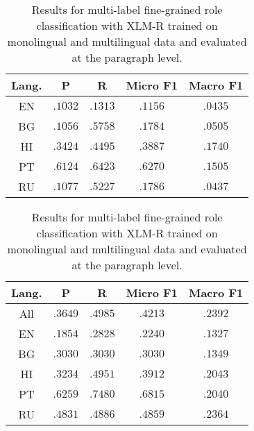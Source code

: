 \begin{table}[h]
\footnotesize
\centering

\begin{subtable}[h]{0.9\columnwidth}
\small
\centering
\caption{Monolingual setting}
\begin{tabular}{ccccc}
\toprule
Lang. & P & R & Micro F1 & Macro F1 \\
\midrule
EN & $.1032$ & $.1313$ & $.1156$ & $.0435$ \\
BG & $.1056$ & $.5758$ & $.1784$ & $.0505$ \\
HI & $.3424$ & $.4495$ & $.3887$ & $.1740$ \\
PT & $.6124$ & $.6423$ & $.6270$ & $.1505$ \\
RU & $.1077$ & $.5227$ & $.1786$ & $.0437$ \\
\bottomrule
\end{tabular}

\end{subtable}
\hfill

\begin{subtable}[h]{0.9\columnwidth}
\small
\centering
\caption{Multilingual setting}
\begin{tabular}{ccccc}
\toprule
Lang. & P & R & Micro F1 & Macro F1 \\
\midrule
All & $.3649$ & $.4985$ & $.4213$ & $.2392$ \\ \midrule
EN & $.1854$ & $.2828$ & $\mathbf{.2240}$ & $\mathbf{.1327}$ \\
BG & $.3030$ & $.3030$ & $\mathbf{.3030}$ & $\mathbf{.1349}$ \\
HI & $.3234$ & $.4951$ & $\mathbf{.3912}$ & $\mathbf{.2043}$ \\
PT & $.6259$ & $.7480$ & $\mathbf{.6815}$ & $\mathbf{.2040}$ \\
RU & $.4831$ & $.4886$ & $\mathbf{.4859}$ & $\mathbf{.2364}$ \\
\bottomrule
\end{tabular}
\end{subtable}

\caption{Results for multi-label fine-grained role classification with XLM-R trained on monolingual and multilingual data and evaluated at the paragraph level.}
\label{tab:xlmr_language_results}
\end{table}






